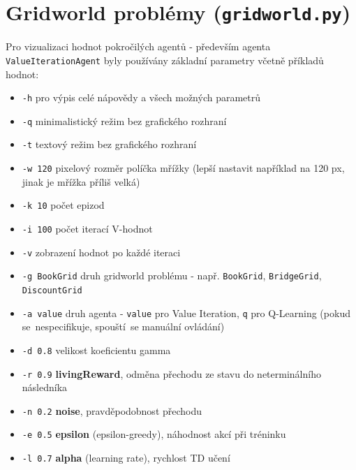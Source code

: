 \section{Gridworld problémy (\texttt{gridworld.py})}
\label{priloha:manualg}
Pro vizualizaci hodnot pokročilých agentů - především agenta \texttt{ValueIterationAgent} byly používány základní parametry včetně příkladů hodnot:
\begin{itemize}
\item \texttt{-h} pro výpis celé nápovědy a všech možných parametrů
\item \texttt{-q} minimalistický režim bez grafického rozhraní
\item \texttt{-t} textový režim bez grafického rozhraní
\item \texttt{-w 120} pixelový rozměr políčka mřížky (lepší nastavit například na 120 px, jinak je mřížka příliš velká)
\item \texttt{-k 10} počet epizod
\item \texttt{-i 100} počet iterací V-hodnot
\item \texttt{-v} zobrazení hodnot po každé iteraci
\item \texttt{-g BookGrid} druh gridworld problému - např. \texttt{BookGrid}, \texttt{BridgeGrid}, \texttt{DiscountGrid}
\item \texttt{-a value} druh agenta - \texttt{value} pro Value Iteration, \texttt{q} pro Q-Learning (pokud se~nespecifikuje, spouští~se manuální ovládání)
\item \texttt{-d 0.8} velikost koeficientu gamma
\item \texttt{-r 0.9} \textbf{livingReward}, odměna přechodu ze stavu do neterminálního následníka
\item \texttt{-n 0.2} \textbf{noise}, pravděpodobnost přechodu 
\item \texttt{-e 0.5} \textbf{epsilon} (epsilon-greedy), náhodnost akcí při tréninku
\item \texttt{-l 0.7} \textbf{alpha} (learning rate), rychlost TD učení
\end{itemize}
